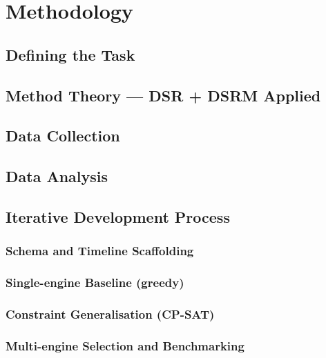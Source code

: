 \chapter{Methodology}
\label{chap:method}



\section{Defining the Task}
\label{sec:defining-task}


\section{Method Theory --- DSR + DSRM Applied}
\label{sec:dsr-dsrm}


\section{Data Collection}
\label{sec:data-collection}


\section{Data Analysis}
\label{sec:data-analysis}


\section{Iterative Development Process}
\label{sec:iterations}

\subsection{Schema and Timeline Scaffolding}
\label{sec:iter-schema}

\subsection{Single-engine Baseline (greedy)}
\label{sec:iter-greedy}

\subsection{Constraint Generalisation (CP-SAT)}
\label{sec:iter-cpsat}

\subsection{Multi-engine Selection and Benchmarking}
\label{sec:iter-multiengine}

